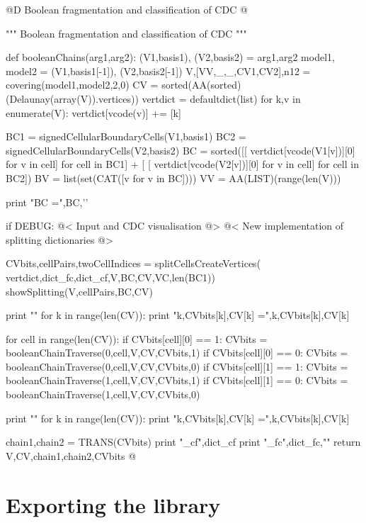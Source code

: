 \documentclass[11pt,oneside]{article}	%
\begin{document}
@D Boolean fragmentation and classification of CDC
@{""" Boolean fragmentation and classification of CDC """

def booleanChains(arg1,arg2):
	(V1,basis1), (V2,basis2) = arg1,arg2
	model1, model2 = (V1,basis1[-1]), (V2,basis2[-1])
	V,[VV,_,_,CV1,CV2],n12 = covering(model1,model2,2,0)
	CV = sorted(AA(sorted)(Delaunay(array(V)).vertices))
	vertdict = defaultdict(list)
	for k,v in enumerate(V): vertdict[vcode(v)] += [k]
	
	BC1 = signedCellularBoundaryCells(V1,basis1)
	BC2 = signedCellularBoundaryCells(V2,basis2)
	BC = sorted([[ vertdict[vcode(V1[v])][0] for v in cell] for cell in BC1] + [ 
			[ vertdict[vcode(V2[v])][0] for v in cell] for cell in BC2])
	BV = list(set(CAT([v for v in BC])))
	VV = AA(LIST)(range(len(V)))

	print "\n BC =",BC,'\n'


	if DEBUG: 
		@< Input and CDC visualisation @>
	@< New implementation of splitting dictionaries @>
	
	CVbits,cellPairs,twoCellIndices = splitCellsCreateVertices( 
		vertdict,dict_fc,dict_cf,V,BC,CV,VC,len(BC1))
	showSplitting(V,cellPairs,BC,CV)
	
	print "\n"
	for k in range(len(CV)):  print "k,CVbits[k],CV[k] =",k,CVbits[k],CV[k]
	
	for cell in range(len(CV)):
		if CVbits[cell][0] == 1:
			CVbits = booleanChainTraverse(0,cell,V,CV,CVbits,1)		
		if CVbits[cell][0] == 0:
			CVbits = booleanChainTraverse(0,cell,V,CV,CVbits,0)
		if CVbits[cell][1] == 1:
			CVbits = booleanChainTraverse(1,cell,V,CV,CVbits,1)
		if CVbits[cell][1] == 0:
			CVbits = booleanChainTraverse(1,cell,V,CV,CVbits,0)
	
	print "\n"
	for k in range(len(CV)):  print "k,CVbits[k],CV[k] =",k,CVbits[k],CV[k]
	
	chain1,chain2 = TRANS(CVbits)
	print "\ndict_cf",dict_cf
	print "\ndict_fc",dict_fc,"\n"
	return V,CV,chain1,chain2,CVbits
@}



\section{Exporting the library}
\end{document}
